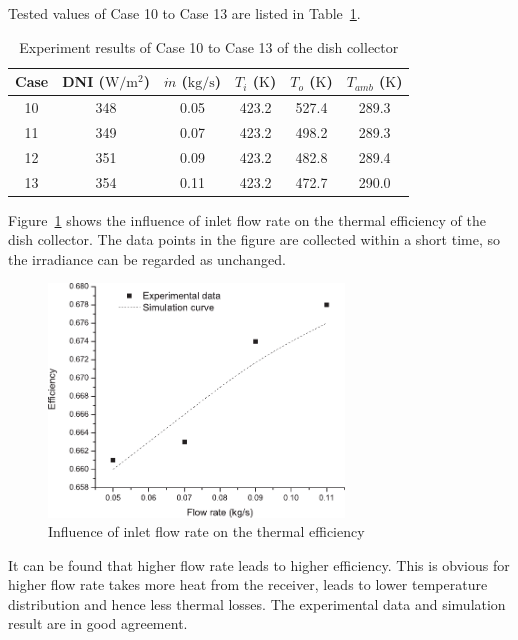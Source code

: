 Tested values of Case 10 to Case 13 are listed in Table~\ref{tab:ResultOfDish2}.

\begin{table}[htbp]\footnotesize
	\caption{Experiment results of Case 10 to Case 13 of the dish collector}
	\begin{center}
	\begin{tabular}{cccccc}
		\toprule
		Case	& DNI ($\mathrm{W/m^2}$)	&	$\dot{m}$ ($\mathrm{kg/s}$)			&	$T_i$ ($\mathrm{K}$)	&	$T_o$ ($\mathrm{K}$)		&	$T_{amb}$ ($\mathrm{K}$)\\
		\midrule
		10	&	348	&	0.05	&	423.2	&	527.4	&	289.3\\
		11	&	349	&	0.07	&	423.2	&	498.2	&	289.3\\
		12	&	351	&	0.09	&	423.2	&	482.8	&	289.4	\\
		13	&	354	&	0.11	&	423.2	&	472.7	&	290.0\\
		\bottomrule
	\end{tabular}
	\end{center}
	\label{tab:ResultOfDish2}
\end{table}


Figure~\ref{fig:q_m-eta} shows the influence of inlet flow rate on the thermal efficiency of the dish collector. The data points in the figure are collected within a short time, so the irradiance can be regarded as unchanged.
\begin{figure}[!ht]
\centering
\includegraphics[width=0.7\textwidth]{fig/q_m-eta}
\caption{Influence of inlet flow rate on the thermal efficiency}
\label{fig:q_m-eta}
\end{figure}

It can be found that higher flow rate leads to higher efficiency. This is obvious for higher flow rate takes more heat from the receiver, leads to lower temperature distribution and hence less thermal losses. The experimental data and simulation result are in good agreement.

